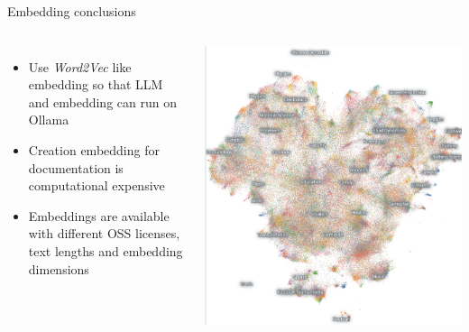 \documentclass[aspectratio=169]{beamer}
\begin{document}
\begin{frame}{Embedding conclusions}
\begin{columns}
\begin{itemize}
  \item Use \emph{Word2Vec} like embedding so that LLM and embedding can run on Ollama
  \item Creation embedding for documentation is computational expensive
  \item Embeddings are available with different OSS licenses, text lengths and embedding dimensions
\end{itemize}
  \includegraphics[width=\linewidth]{Noimic}
\end{columns}
\end{frame}
\end{document}
